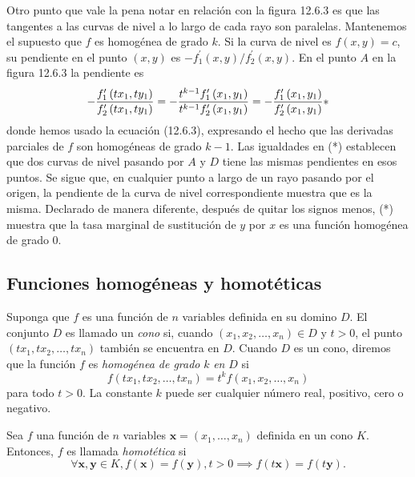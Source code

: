 Otro punto que vale la pena notar en relación con la figura 12.6.3 es que las tangentes a las curvas de nivel a lo largo de cada rayo son paralelas. Mantenemos el supuesto que $f$ es homogénea de grado $k$. Si la curva de nivel es $f\left(x,y\right)=c$, su pendiente en el punto $\left(x,y\right)$ es $-f^{\prime}_{1}\left(x,y\right)/f^{\prime}_{2}\left(x,y\right)$. En el punto $A$ en la figura 12.6.3 la pendiente es
\begin{equation}
-\frac{f^{\prime}_{1}\left(tx_{1},ty_{1}\right)}{f^{\prime}_{2}\left(tx_{1},ty_{1}\right)}=-\frac{t^{k-1}f^{\prime}_{1}\left(x_{1},y_{1}\right)}{t^{k-1}f^{\prime}_{2}\left(x_{1},y_{1}\right)}=-\frac{f^{\prime}_{1}\left(x_{1},y_{1}\right)}{f^{\prime}_{2}\left(x_{1},y_{1}\right)}\notag{*}
\end{equation}
donde hemos usado la ecuación (12.6.3), expresando el hecho que las derivadas parciales de $f$ son homogéneas de grado $k-1$. Las igualdades en (*) establecen que dos curvas de nivel pasando por $A$ y $D$ tiene las mismas pendientes en esos puntos. Se sigue que, en cualquier punto a largo de un rayo pasando por el origen, la pendiente de la curva de nivel correspondiente muestra que es la misma. Declarado de manera diferente, después de quitar los signos menos, (*) muestra que la tasa marginal de sustitución de $y$ por $x$ es una función homogénea de grado $0$.

\subsection{Funciones homogéneas y homotéticas}

Suponga que $f$ es una función de $n$ variables definida en su domino $D$. El conjunto $D$ es llamado un \emph{cono} si, cuando $\left(x_{1},x_{2},\ldots,x_{n}\right)\in D$ y $t>0$, el punto $\left(tx_{1},tx_{2},\ldots,tx_{n}\right)$ también se encuentra en $D$. Cuando $D$ es un cono, diremos que la función $f$ es \emph{homogénea de grado} $k$ \emph{en} $D$ si
\begin{equation}
f\left(tx_{1},tx_{2},\ldots,tx_{n}\right)=t^{k}f\left(x_{1},x_{2},\ldots,x_{n}\right)
\end{equation}
para todo $t>0$. La constante $k$ puede ser cualquier número real, positivo, cero o negativo.

\begin{frame}
\begin{definition}
Sea $f$ una función de $n$ variables $\bm{x}=\left(x_{1},\ldots,x_{n}\right)$ definida en un cono $K$. Entonces, $f$ es llamada \emph{homotética} si \[ \forall\bm{x},\bm{y}\in K,f\left(\bm{x}\right)=f\left(\bm{y}\right),t>0\implies f\left(t\bm{x}\right)=f\left(t\bm{y}\right). \]
\end{definition}
\end{frame}

